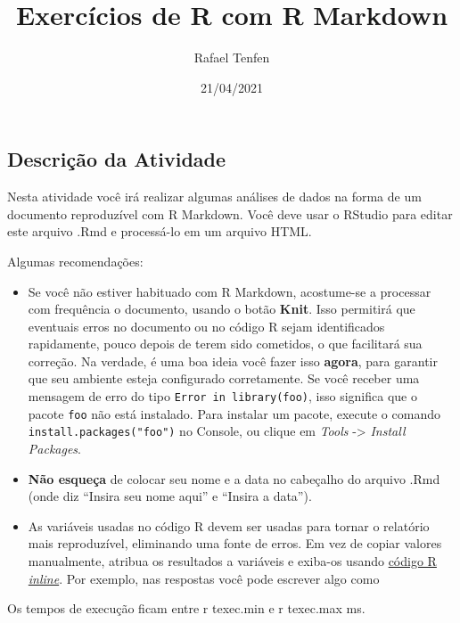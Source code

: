 \documentclass[
]{article}
\title{Exercícios de R com R Markdown}
\author{Rafael Tenfen}
\date{21/04/2021}
\newenvironment{Shaded}{\begin{snugshade}}{\end{snugshade}}
\newcommand{\AttributeTok}[1]{\textcolor[rgb]{0.77,0.63,0.00}{#1}}
\newcommand{\NormalTok}[1]{#1}
\newcommand{\StringTok}[1]{\textcolor[rgb]{0.31,0.60,0.02}{#1}}
\providecommand{\tightlist}{%
  \setlength{\itemsep}{0pt}\setlength{\parskip}{0pt}}
\begin{document}
\maketitle

\hypertarget{descriuxe7uxe3o-da-atividade}{%
\subsection{Descrição da Atividade}\label{descriuxe7uxe3o-da-atividade}}

Nesta atividade você irá realizar algumas análises de dados na forma de
um documento reproduzível com R Markdown. Você deve usar o RStudio para
editar este arquivo .Rmd e processá-lo em um arquivo HTML.

Algumas recomendações:

\begin{itemize}
\tightlist
\item
  Se você não estiver habituado com R Markdown, acostume-se a processar
  com frequência o documento, usando o botão \textbf{Knit}. Isso
  permitirá que eventuais erros no documento ou no código R sejam
  identificados rapidamente, pouco depois de terem sido cometidos, o que
  facilitará sua correção. Na verdade, é uma boa ideia você fazer isso
  \textbf{agora}, para garantir que seu ambiente esteja configurado
  corretamente. Se você receber uma mensagem de erro do tipo
  \texttt{Error\ in\ library(foo)}, isso significa que o pacote
  \texttt{foo} não está instalado. Para instalar um pacote, execute o
  comando \texttt{install.packages("foo")} no Console, ou clique em
  \emph{Tools} -\textgreater{} \emph{Install Packages}.
\item
  \textbf{Não esqueça} de colocar seu nome e a data no cabeçalho do
  arquivo .Rmd (onde diz ``Insira seu nome aqui'' e ``Insira a data'').
\item
  As variáveis usadas no código R devem ser usadas para tornar o
  relatório mais reproduzível, eliminando uma fonte de erros. Em vez de
  copiar valores manualmente, atribua os resultados a variáveis e
  exiba-os usando
  \href{https://bookdown.org/yihui/rmarkdown-cookbook/r-code.html}{código
  R \emph{inline}}. Por exemplo, nas respostas você pode escrever algo
  como
\end{itemize}

\begin{Shaded}
\begin{Highlighting}[]
\NormalTok{Os tempos de execução ficam entre }\StringTok{\textasciigrave{}}\AttributeTok{r texec.min}\StringTok{\textasciigrave{}}\NormalTok{ e }\StringTok{\textasciigrave{}}\AttributeTok{r texec.max}\StringTok{\textasciigrave{}}\NormalTok{ ms.}
\end{Highlighting}
\end{Shaded}
\end{document}
